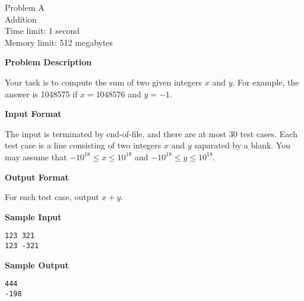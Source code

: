 \documentclass[11pt]{article}
\begin{document}
\begin{center}
    {\LARGE Problem A}\\
    {\Large Addition}\\
    {Time limit: 1 second}\\
    {Memory limit: 512 megabytes}
\end{center}

\textbf{\large Problem Description}

Your task is to compute the sum of two given integers $x$ and $y$. For example,
the answer is 1048575 if $x=1048576$ and $y=-1$.

\textbf{\large Input Format}

The input is terminated by end-of-file, and there are at most 30 test cases.
Each test case is a line consisting of two integers $x$ and $y$ saparated by
a blank. You may assume that $-10^{18}\le x \le 10^{18}$ and 
$-10^{18}\le y \le 10^{18}$.

\textbf{\large Output Format}

For each test case, output $x+y$.

\textbf{\large Sample Input}

\begin{verbatim}
123 321
123 -321
\end{verbatim}

\textbf{\large Sample Output}
\begin{verbatim}
444
-198
\end{verbatim}
\end{document}
